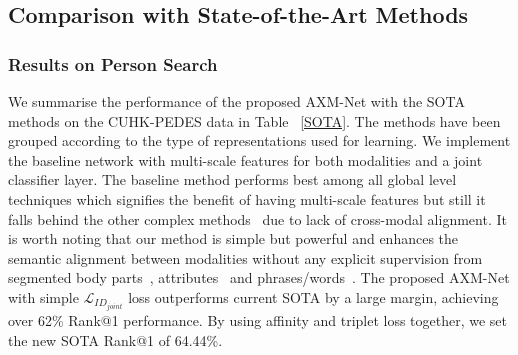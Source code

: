 \documentclass[letterpaper]{article} \usepackage{aaai22}  \usepackage{times}  \usepackage{helvet}  \usepackage{courier}  \usepackage[hyphens]{url}  \usepackage{graphicx} \urlstyle{rm} \def\UrlFont{\rm}  \usepackage{natbib}  \usepackage{caption} \DeclareCaptionStyle{ruled}{labelfont=normalfont,labelsep=colon,strut=off} \frenchspacing  \setlength{\pdfpagewidth}{8.5in}  \setlength{\pdfpageheight}{11in}  \usepackage{algorithm}
\begin{document}
\subsection{Comparison with State-of-the-Art Methods}
\subsubsection{Results on Person Search}
We summarise the performance of the proposed AXM-Net with the SOTA methods on the CUHK-PEDES data in Table ~\ref{SOTA}. The methods have been grouped according to the type of representations used for learning. We implement the baseline network with multi-scale features for both modalities and a joint classifier layer. The baseline method performs best among all global level techniques which signifies the benefit of having multi-scale features but still it falls behind the other complex methods~\cite{wang2020vitaa,aggarwal2020text,wang2020img,gumbel2020} due to lack of cross-modal alignment.
It is worth noting that our method is simple but powerful and enhances the semantic alignment between modalities without any explicit supervision from segmented body parts~\cite{wang2020vitaa}, attributes~\cite{aggarwal2020text} and phrases/words~\cite{gumbel2020}. The proposed AXM-Net with simple $\mathcal{L}_{ID_{joint}}$ loss outperforms current SOTA by a large margin, achieving over 62\% Rank@1 performance. By using affinity and triplet loss together, we set the new SOTA Rank@1 of 64.44\%.
\end{document}
